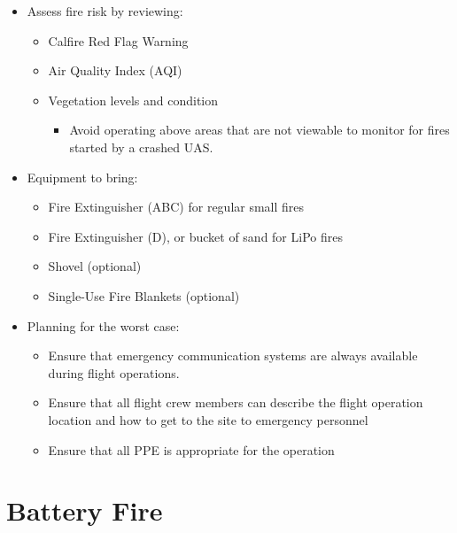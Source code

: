 \documentclass[
]{book}
\providecommand{\tightlist}{%
  \setlength{\itemsep}{0pt}\setlength{\parskip}{0pt}}
\begin{document}
\begin{itemize}
\tightlist
\item
  Assess fire risk by reviewing:

  \begin{itemize}
  \tightlist
  \item
    Calfire Red Flag Warning
  \item
    Air Quality Index (AQI)
  \item
    Vegetation levels and condition

    \begin{itemize}
    \tightlist
    \item
      Avoid operating above areas that are not viewable to monitor for fires started by a crashed UAS.
    \end{itemize}
  \end{itemize}
\item
  Equipment to bring:

  \begin{itemize}
  \tightlist
  \item
    Fire Extinguisher (ABC) for regular small fires
  \item
    Fire Extinguisher (D), or bucket of sand for LiPo fires
  \item
    Shovel (optional)
  \item
    Single-Use Fire Blankets (optional)
  \end{itemize}
\item
  Planning for the worst case:

  \begin{itemize}
  \tightlist
  \item
    Ensure that emergency communication systems are always available during flight operations.
  \item
    Ensure that all flight crew members can describe the flight operation location and how to get to the site to emergency personnel
  \item
    Ensure that all PPE is appropriate for the operation
  \end{itemize}
\end{itemize}

\hypertarget{battery-fire}{%
\section{Battery Fire}\label{battery-fire}}
\end{document}
